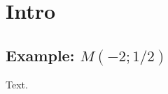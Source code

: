 \documentclass{article}
\begin{document}
\tableofcontents
\section{Intro}
\subsection[Example: $M(-2;1/2)]{Example: $M(-2;1/2)$}
Text.
\end{document}
